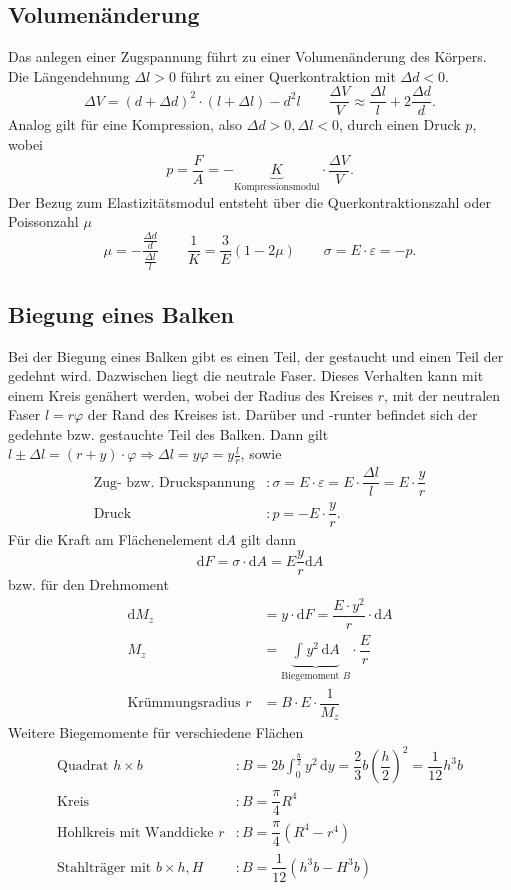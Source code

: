 \documentclass[a4paper,12pt]{article}
\newcommand{\td}{\,\text{d}}
\begin{document}
\subsection{Volumenänderung}
Das anlegen einer Zugspannung führt zu einer Volumenänderung des Körpers. Die Längendehnung $\Delta l>0$ führt zu einer Querkontraktion mit $\Delta d<0$.
\[ 
        \Delta V=\left(d+\Delta d\right)^2\cdot \left(l+\Delta l\right)-d^2l\qquad \dfrac{\Delta V}{V}\approx \dfrac{\Delta l}{l}+2\dfrac{\Delta d}{d}
.\] 
Analog gilt für eine Kompression, also $\Delta d>0,\Delta l<0$, durch einen Druck $p$, wobei 
\[ 
        p=\dfrac{F}{A}=-\underbrace{K}_{\text{Kompressionsmodul}}\cdot \dfrac{\Delta V}{V}
.\] 
Der Bezug zum Elastizitätsmodul entsteht über die Querkontraktionszahl oder Poissonzahl $\mu $ 
\[ 
        \mu =-\dfrac{\tfrac{\Delta d}{d}}{\tfrac{\Delta l}{l}}\qquad \dfrac{1}{K}=\dfrac{3}{E}\left(1-2\mu \right)\qquad \sigma =E\cdot \varepsilon=-p
.\] 

\subsection{Biegung eines Balken}
Bei der Biegung eines Balken gibt es einen Teil, der gestaucht und einen Teil der gedehnt wird. Dazwischen liegt die neutrale Faser. Dieses Verhalten kann mit einem Kreis genähert werden, wobei der Radius des Kreises $r$, mit der neutralen Faser $l=r\varphi $ der Rand des Kreises ist. Darüber und -runter befindet sich der gedehnte bzw. gestauchte Teil des Balken. Dann gilt $l\pm \Delta l=\left(r+y\right)\cdot \varphi \Rightarrow \Delta l=y\varphi =y\tfrac{l}{r}$, sowie
\begin{align*}
        \text{Zug- bzw. Druckspannung}&:\sigma =E\cdot \varepsilon =E\cdot \dfrac{\Delta l}{l}=E\cdot \dfrac{y}{r}\\
        \text{Druck}&:p=-E\cdot \dfrac{y}{r}
.\end{align*}
Für die Kraft am Flächenelement $\text{d}A$ gilt dann
\[ 
        \text{d}F=\sigma \cdot \text{d}A=E\dfrac{y}{r}\text{d}A
\]  
bzw. für den Drehmoment
\begin{align*}
        \text{d}M_z&=y\cdot \text{d}F=\dfrac{E\cdot y^2}{r}\cdot \text{d}A\\
        M_z&=\underbrace{\int_{}^{}y^2\td A}_{\text{Biegemoment }B}\cdot \dfrac{E}{r}\\
        \text{Krümmungsradius }r&=B\cdot E\cdot \dfrac{1}{M_z}
\end{align*} 
Weitere Biegemomente für verschiedene Flächen
\begin{align*}
        \text{Quadrat }h\times b&:B=2b\int_{0}^{\tfrac{h}{2}}y^2\td y=\dfrac{2}{3}b\left(\dfrac{h}{2}\right)^2=\dfrac{1}{12}h^3b\\
        \text{Kreis}&:B=\dfrac{\pi }{4}R^4\\
        \text{Hohlkreis mit Wanddicke }r&:B=\dfrac{\pi }{4}\left(R^4-r^4\right)\\
        \text{Stahlträger mit }b\times h,H&:B=\dfrac{1}{12}\left(h^3b-H^3b\right)
\end{align*}
\end{document}
